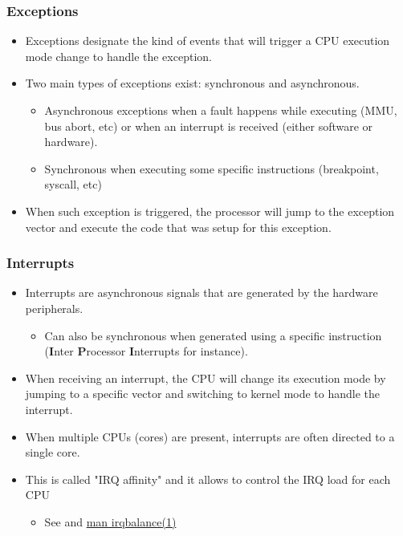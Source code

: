 \begin{frame}
  \frametitle{Exceptions}
  \begin{itemize}
    \item Exceptions designate the kind of events that will trigger a CPU
          execution mode change to handle the exception.
    \item Two main types of exceptions exist: synchronous and asynchronous.
    \begin{itemize}
      \item Asynchronous exceptions when a fault happens while executing (MMU,
            bus abort, etc) or when an interrupt is received (either software
            or hardware).
      \item Synchronous when executing some specific instructions (breakpoint,
            syscall, etc)
    \end{itemize}
    \item When such exception is triggered, the processor will jump to the
          exception vector and execute the code that was setup for this
          exception.
  \end{itemize}
\end{frame}

\begin{frame}
  \frametitle{Interrupts}
  \begin{itemize}
    \item Interrupts are asynchronous signals that are generated by the hardware
          peripherals.
    \begin{itemize}
      \item Can also be synchronous when generated using a specific instruction
            ({\bf I}nter {\bf P}rocessor {\bf I}nterrupts for instance).
    \end{itemize}
    \item When receiving an interrupt, the CPU will change its execution mode by
          jumping to a specific vector and switching to kernel mode to handle the
          interrupt.
    \item When multiple CPUs (cores) are present, interrupts are often directed
          to a single core.
    \item This is called "IRQ affinity" and it allows to control the IRQ load for
          each CPU
    \begin{itemize}
      \item See  and
            \href{https://manpages.org/irqbalance/1}{man irqbalance(1)}
    \end{itemize}
  \end{itemize}
\end{frame}

